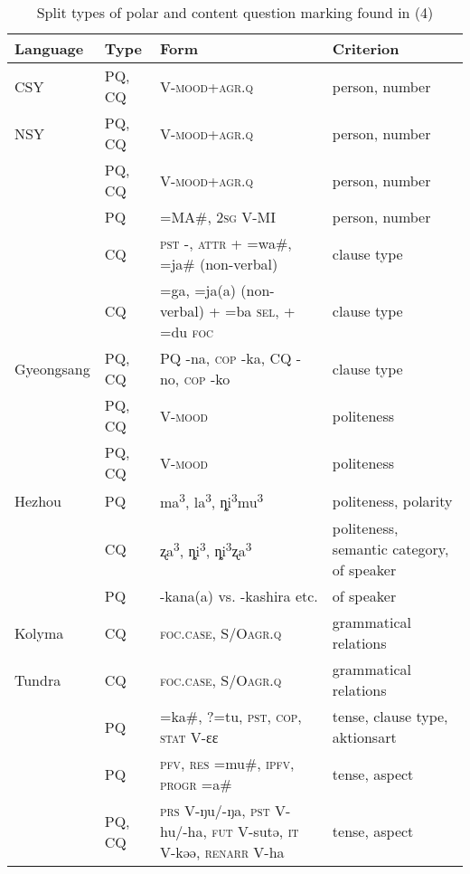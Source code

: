 \begin{table}
\caption{Split types of polar and content question marking found in  (4)}
\label{tab:6:5}
\footnotesize
\begin{tabularx}{\textwidth}{llQQ}
\lsptoprule

\textbf{Language} & \textbf{Type} & \textbf{Form} & \textbf{Criterion}\\
\midrule
CSY & PQ, CQ & \textsc{V-mood+agr.q} & person, number\\
NSY & PQ, CQ & \textsc{V-mood+agr.q} & person, number\\
 & PQ, CQ & \textsc{V-mood+agr.q} & person, number\\
 & PQ & =MA\#, 2\textsc{sg} V-MI & person, number\\
 & CQ & \textsc{pst -, attr} + =wa\#, =ja\# (non-verbal) & clause type\\
 & CQ & =ga, =ja(a) (non-verbal) + =ba \textsc{sel,} + =du \textsc{foc} & clause type\\
Gyeongsang & PQ, CQ & PQ -na, \textsc{cop} -ka, CQ -no, \textsc{cop} -ko & clause type\\
 & PQ, CQ & \textsc{V-mood} & politeness\\
 & PQ, CQ & \textsc{V-mood} & politeness\\
Hezhou  & PQ & ma\textsuperscript{3}, la\textsuperscript{3}, ȵi\textsuperscript{3}mu\textsuperscript{3} & politeness, polarity\\
& CQ & ʐa\textsuperscript{3}, ȵi\textsuperscript{3}, ȵi\textsuperscript{3}ʐa\textsuperscript{3} & politeness, semantic category,  of speaker\\
 & PQ & {}-kana(a) vs. -kashira etc. &  of speaker\\
Kolyma  & CQ & \textsc{foc.case}, S/O\textsc{agr.q} & grammatical relations\\
Tundra  & CQ & \textsc{foc.case}, S/O\textsc{agr.q} & grammatical relations\\
 & PQ & =ka\#, ?=tu, \textsc{pst}, \textsc{cop}, \textsc{stat} V-ɛɛ & tense, clause type, aktionsart\\
 & PQ & \textsc{pfv}, \textsc{res} =mu\#, \textsc{ipfv}, \textsc{progr} =a\# & tense, aspect\\
 & PQ, CQ & \textsc{prs} V{}-ŋu/-ŋa, \textsc{pst} V{}-hu/-ha, \textsc{fut} V{}-sutə, \textsc{it} V{}-kəə, \textsc{renarr} V{}-ha & tense, aspect\\

\end{tabularx}
\end{table}

